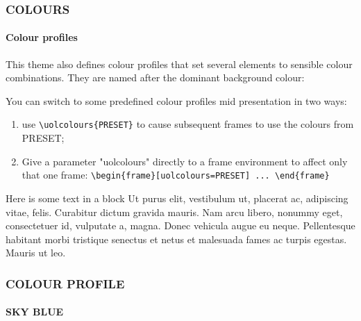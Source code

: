 \documentclass[
aspectratio=169,
]{beamer}
\begin{document}
\begin{frame}[t,fragile]
    \frametitle{COLOURS}
    \framesubtitle{Colour profiles}

    This theme also defines colour profiles that 
    set several elements to sensible colour combinations.
    They are named after the dominant background colour:


        \vfill
        You can switch to some predefined colour profiles mid presentation in two ways:
 \begin{enumerate}
     \item use \verb|\uolcolours{PRESET}| to cause subsequent frames to use the colours from PRESET;
     \item 
         Give a parameter "uolcolours" directly to a frame environment to affect only that one frame:
         \verb|\begin{frame}[uolcolours=PRESET] ... \end{frame}|
 \end{enumerate}
\end{frame}



\begin{frame}[uolcolours=Sky Blue]
    \begin{block}{Here is some text in a block}
      Ut purus elit, vestibulum ut, placerat ac, adipiscing vitae, felis. Curabitur dictum
gravida mauris. Nam arcu libero, nonummy eget, consectetuer id, vulputate a, magna.
Donec vehicula augue eu neque. Pellentesque habitant morbi tristique senectus et
netus et malesuada fames ac turpis egestas. Mauris ut leo.
    \end{block}
\end{frame}
\begin{frame}[uolcolours=Sky Blue]
    \frametitle{COLOUR PROFILE}
    \framesubtitle{SKY BLUE}
    \democontent
\end{frame}
\end{document}
